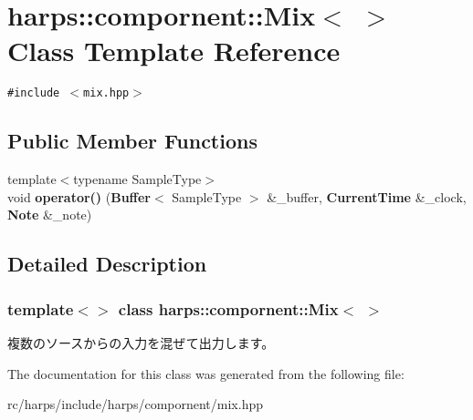 \section{harps::compornent::Mix$<$ $>$ Class Template Reference}
\label{classharps_1_1compornent_1_1Mix_3_01_01_4}
{\tt \#include $<$mix.hpp$>$}

\subsection*{Public Member Functions}
\begin{CompactItemize}
\item 
{\footnotesize template$<$typename SampleType$>$ }\\void \textbf{operator()} ({\bf Buffer}$<$ SampleType $>$ \&\_\-buffer, {\bf CurrentTime} \&\_\-clock, {\bf Note} \&\_\-note)\label{classharps_1_1compornent_1_1Mix_3_01_01_4_def174a51cea11929e3c7896e4ccc999}

\end{CompactItemize}


\subsection{Detailed Description}
\subsubsection*{template$<$$>$ class harps::compornent::Mix$<$  $>$}

複数のソースからの入力を混ぜて出力します。 

The documentation for this class was generated from the following file:\begin{CompactItemize}
\item 
rc/harps/include/harps/compornent/mix.hpp\end{CompactItemize}

